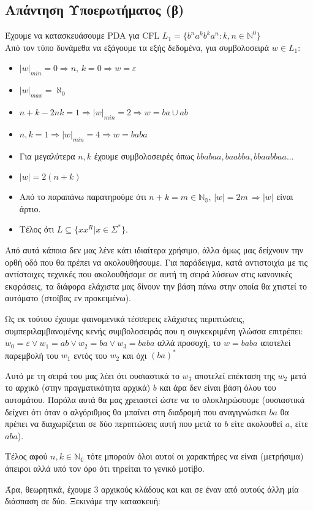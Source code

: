 \subsection{Απάντηση Υποερωτήματος (β)}
\label{ssec:Solution_2.2}
\doublespacing
Έχουμε να κατασκευάσουμε PDA για CFL $L_1 = \{b^n a^k b^k a^n : k, n \in  \mathbb{N}^0 \}$\\
Από τον τύπο δυνάμεθα να εξάγουμε τα εξής δεδομένα, για συμβολοσειρά $w \in L_1$:
\begin{itemize}
	\itemsep0em
	\item $\vert w \vert_{min} = 0 \Longrightarrow n,\,k = 0 \Longrightarrow w = ε $
	\item $\vert w \vert_{max} = \aleph_0$
	\item $ n + k - 2nk = 1  \Longrightarrow |w|_{min} = 2 \Longrightarrow w = ba \cup ab$
	\item $ n, k = 1 \Longrightarrow \vert w \vert_{min} = 4 \Longrightarrow w = baba$
	\item Για μεγαλύτερα $n, k$ έχουμε συμβολοσειρές όπως $bbabaa, baabba, bbaabbaa...$
	\item $ |w| = 2(n+k)$
	\item Από το παραπάνω παρατηρούμε ότι $n + k = m \in \mathbb{N_0},\,|w| = 2m\, \Longrightarrow |w|$ είναι άρτιο.
	\item Τέλος ότι $L \subseteq \{xx^R \vert x \in \Sigma^* \} $.
\end{itemize}

\par
Από αυτά κάποια δεν μας λένε κάτι ιδιαίτερα χρήσιμο, άλλα όμως μας δείχνουν την ορθή οδό που θα πρέπει να
ακολουθήσουμε. Για παράδειγμα, κατά αντιστοιχία με τις αντίστοιχες τεχνικές που ακολουθήσαμε σε αυτή τη σειρά
λύσεων στις κανονικές εκφράσεις, τα διάφορα ελάχιστα μας δίνουν την βάση πάνω στην οποία θα χτιστεί το αυτόματο
(στοίβας εν προκειμένω).
\par
Ως εκ τούτου έχουμε φαινομενικά τέσσερεις ελάχιστες περιπτώσεις, συμπεριλαμβανομένης κενής συμβολοσειράς που η
συγκεκριμένη γλώσσα επιτρέπει:
$w_0 = ε \lor w_1 = ab \lor w_2 = ba \lor w_3 = baba$ αλλά προσοχή, το $w = baba$
αποτελεί παρεμβολή του $w_1$ εντός του $w_2$ και όχι $(ba)^*$
\par
Αυτό με τη σειρά του μας λέει ότι ουσιαστικά το $w_3$ αποτελεί επέκταση της $w_2$ μετά το αρχικό (στην
πραγματικότητα αρχικά) $b$ και άρα δεν είναι βάση όλου του αυτομάτου. Παρόλα αυτά θα μας χρειαστεί ώστε να το
ολοκληρώσουμε (ουσιαστικά δείχνει ότι όταν ο αλγόριθμος θα μπαίνει στη διαδρομή που αναγιγνώσκει $ba$ θα πρέπει να
διαχωρίζεται σε δύο περιπτώσεις αυτή που μετά το $b$ είτε ακολουθεί $a$, είτε $aba$).
\par Τέλος αφού $n, k \in \mathbb{N_0}$ τότε μπορούν όλοι αυτοί οι χαρακτήρες να είναι (μετρήσιμα) άπειροι αλλά υπό
τον όρο ότι τηρείται το γενικό μοτίβο.
\par Άρα, θεωρητικά, έχουμε 3 αρχικούς κλάδους και  και σε έναν από αυτούς άλλη μία διάσπαση σε δύο. Ξεκινάμε την
κατασκευή:


